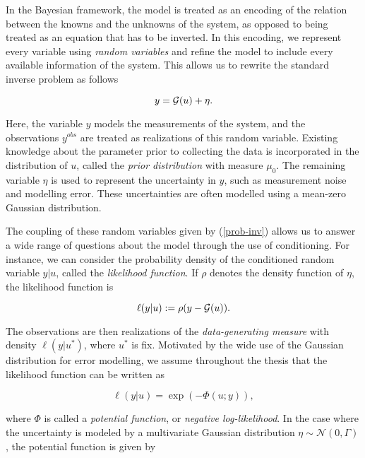 In the Bayesian framework, the model is treated as an encoding of the relation between the knowns and the unknowns of the system, as opposed to being treated as an equation that has to be inverted. In this encoding, we represent every variable using \textit{random variables} and refine the model to include every available information of the system. This allows us to rewrite the standard inverse problem as follows

\begin{equation}\label{prob-inv}
  y = \mathcal{G}(u) + \eta.
\end{equation}

Here, the variable $y$ models the measurements of the system, and the observations $y^{obs}$ are treated as realizations of this random variable. Existing knowledge about the parameter prior to collecting the data is incorporated in the distribution of $u$, called the \textit{prior distribution} with measure $\mu_0$. The remaining variable $\eta$ is used to represent the uncertainty in $y$, such as measurement noise and modelling error. These uncertainties are often modelled using a mean-zero Gaussian distribution.

The coupling of these random variables given by (\ref{prob-inv}) allows us to answer a wide range of questions about the model through the use of conditioning. For instance, we can consider the probability density of the conditioned random variable $y|u$, called the \textit{likelihood function}. If $\rho$ denotes the density function of $\eta$, the likelihood function is

\begin{equation}\label{def-ell}
  \ell(y|u) := \rho(y - \mathcal{G}(u)).
\end{equation}

The observations are then realizations of the \textit{data-generating measure} with density $\ell(y|u^*)$, where $u^*$ is fix. Motivated by the wide use of the Gaussian distribution for error modelling, we assume throughout the thesis that the likelihood function can be written as

\begin{equation} \label{exponential-ell}
  \ell(y|u) = \exp(-\Phi(u;y)),
\end{equation}

where $\Phi$ is called a \textit{potential function}, or \textit{negative log-likelihood}. In the case where the uncertainty is modeled by a multivariate Gaussian distribution $\eta \sim \mathcal{N}(0, \Gamma)$, the potential function is given by

